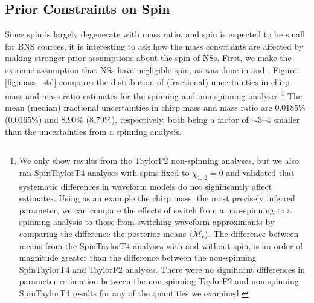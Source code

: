 \subsection{Prior Constraints on Spin}
\label{subsec:prior_constraints}

Since spin is largely degenerate with mass ratio, and spin is expected to be small for BNS sources, it is interesting to ask how the mass constraints are affected by making stronger prior assumptions about the spin of NSs.  First, we make the extreme assumption that NSs have negligible spin, as was done in \citet{Singer_2014} and \citet{Berry_2014}.  Figure \ref{fig:mass_std} compares the distribution of (fractional) uncertainties in chirp-mass and mass-ratio estimates for the spinning and non-spinning analyses.\footnote{We only show results from the TaylorF2 non-spinning analyses, but we also ran SpinTaylorT4 analyses with spins fixed to $\chi_{1,~2}=0$ and validated that systematic differences in waveform models do not significantly affect estimates. Using as an example the chirp mass, the most precisely inferred parameter, we can compare the effects of switch from a non-spinning to a spinning analysis to those from switching waveform approximants by comparing the difference the posterior means $\langle \mathcal{M}_\mathrm{c}\rangle$. The difference between means from the SpinTaylorT4 analyses with and without spin, is an order of magnitude greater than the difference between the non-spinning SpinTaylorT4 and TaylorF2 analyses. There were no significant differences in parameter estimation between the non-spinning TaylorF2 and non-spinning SpinTaylorT4 results for any of the quantities we examined.} The mean (median) fractional uncertainties in chirp mass and mass ratio are $0.0185\%$ ($0.0165\%$) and $8.90\%$ ($8.79\%$), respectively, both being a factor of $\sim3$--$4$ smaller than the uncertainties from a spinning analysis.
  
  
  
  
  
  
  
  
  